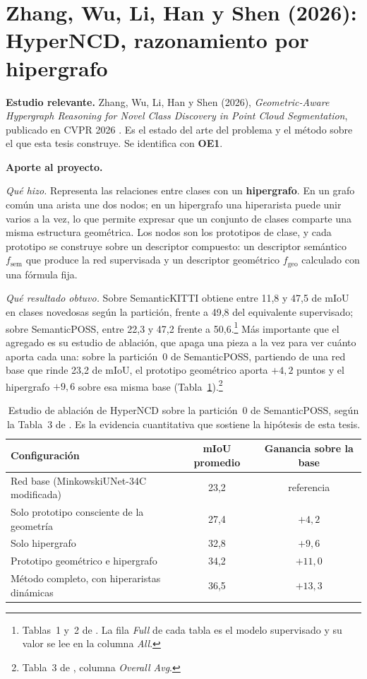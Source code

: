 \section[HyperNCD]{Zhang, Wu, Li, Han y Shen (2026): HyperNCD, razonamiento por
hipergrafo}
\label{sec:hyperncd}

\textbf{Estudio relevante.} Zhang, Wu, Li, Han y Shen (2026),
\emph{Geometric-Aware Hypergraph Reasoning for Novel Class Discovery in Point
Cloud Segmentation}, publicado en CVPR 2026 \cite{zhang2026hyperncd}. Es el
estado del arte del problema y el método sobre el que esta tesis construye. Se
identifica con \textbf{OE1}.

\textbf{Aporte al proyecto.}

\emph{Qué hizo.} Representa las relaciones entre clases con un
\textbf{hipergrafo}. En un grafo común una arista une dos nodos; en un hipergrafo
una hiperarista puede unir varios a la vez, lo que permite expresar que un
conjunto de clases comparte una misma estructura geométrica. Los nodos son los
prototipos de clase, y cada prototipo se construye sobre un descriptor compuesto:
un descriptor semántico $f_{\text{sem}}$ que produce la red supervisada y un
descriptor geométrico $f_{\text{geo}}$ calculado con una fórmula fija.

\emph{Qué resultado obtuvo.} Sobre SemanticKITTI obtiene entre 11,8 y 47,5 de
mIoU en clases novedosas según la partición, frente a 49,8 del equivalente
supervisado; sobre SemanticPOSS, entre 22,3 y 47,2 frente a
50,6.\footnote{Tablas~1 y~2 de \cite{zhang2026hyperncd}. La fila \emph{Full} de
cada tabla es el modelo supervisado y su valor se lee en la columna \emph{All}.}
Más importante que el agregado es su estudio de ablación, que apaga una pieza a
la vez para ver cuánto aporta cada una: sobre la partición~0 de SemanticPOSS,
partiendo de una red base que rinde 23,2 de mIoU, el prototipo geométrico aporta
$+4{,}2$ puntos y el hipergrafo $+9{,}6$ sobre esa misma base
(Tabla~\ref{tab:ablacion-hyperncd}).\footnote{Tabla~3 de
\cite{zhang2026hyperncd}, columna \emph{Overall Avg}.}

\begin{table}[htbp]
\centering
\caption{Estudio de ablación de HyperNCD sobre la partición~0 de SemanticPOSS,
según la Tabla~3 de \cite{zhang2026hyperncd}. Es la evidencia cuantitativa que
sostiene la hipótesis de esta tesis.}
\label{tab:ablacion-hyperncd}
\begin{tabular}{@{}p{6.3cm}cc@{}}
\hline
Configuración & mIoU promedio & Ganancia sobre la base \\
\hline
Red base (MinkowskiUNet-34C modificada) & 23,2 & referencia \\
Solo prototipo consciente de la geometría & 27,4 & $+4{,}2$ \\
Solo hipergrafo & 32,8 & $+9{,}6$ \\
Prototipo geométrico e hipergrafo & 34,2 & $+11{,}0$ \\
Método completo, con hiperaristas dinámicas & 36,5 & $+13{,}3$ \\
\hline
\end{tabular}
\end{table}

